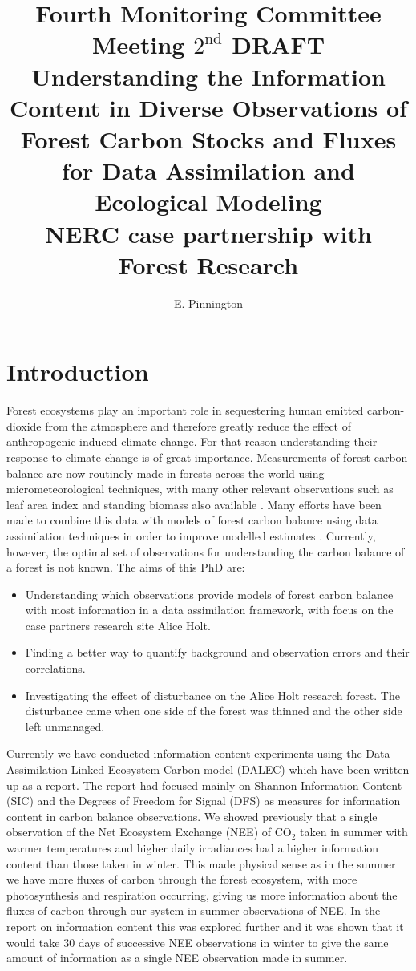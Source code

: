 \documentclass[11pt]{article}
\title{Fourth Monitoring Committee Meeting $2^{\text{nd}}$ DRAFT\\\vspace{4mm} \normalsize{Understanding the Information Content in Diverse Observations of Forest Carbon Stocks and Fluxes for Data Assimilation and Ecological Modeling\\ NERC case partnership with Forest Research}}
\author{\normalsize{E. Pinnington}}
\begin{document}
\maketitle

\section{Introduction}

Forest ecosystems play an important role in sequestering human emitted carbon-dioxide from the atmosphere and therefore greatly reduce the effect of anthropogenic induced climate change. For that reason understanding their response to climate change is of great importance. Measurements of forest carbon balance are now routinely made in forests across the world using micrometeorological techniques, with many other relevant observations such as leaf area index and standing biomass also available \citep{baldocchi2008turner}. Many efforts have been made to combine this data with models of forest carbon balance using data assimilation techniques in order to improve modelled estimates \citep{fox2009reflex}. Currently, however, the optimal set of observations for understanding the carbon balance of a forest is not known. The aims of this PhD are:

\begin{itemize}
\item Understanding which observations provide models of forest carbon balance with most information in a data assimilation framework, with focus on the case partners research site Alice Holt.
\item Finding a better way to quantify background and observation errors and their correlations.
\item Investigating the effect of disturbance on the Alice Holt research forest. The disturbance came when one side of the forest was thinned and the other side left unmanaged. 
\end{itemize}

Currently we have conducted information content experiments using the Data Assimilation Linked Ecosystem Carbon model (DALEC) \citep{williams2005improved} which have been written up as a report. The report had focused mainly on Shannon Information Content (SIC) and the Degrees of Freedom for Signal (DFS) \citep{rodgers2000inverse} as measures for information content in carbon balance observations. We showed previously that a single observation of the Net Ecosystem Exchange (NEE) of CO$_2$ taken in summer with warmer temperatures and higher daily irradiances had a higher information content than those taken in winter. This made physical sense as in the summer we have more fluxes of carbon through the forest ecosystem, with more photosynthesis and respiration occurring, giving us more information about the fluxes of carbon through our system in summer observations of NEE. In the report on information content this was explored further and it was shown that it would take 30 days of successive NEE observations in winter to give the same amount of information as a single NEE observation made in summer.
\end{document}
